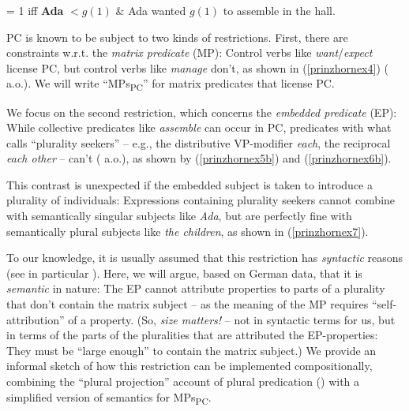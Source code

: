 \documentclass[output=paper,colorlinks,citecolor=brown,
]{langscibook}
\begin{document}
\ea	\label{prinzhornex3}  = 1 iff \textbf{Ada} $< g(1)$ $\&$ Ada wanted $g(1)$ to assemble in the hall. \z

PC is known to be subject to two kinds of restrictions. First, there are constraints w.r.t. the {\it matrix predicate} (MP): Control verbs like {\it want}/{\it expect} license PC, but control verbs like {\it  manage} don't, as shown in (\ref{prinzhornex4}) (\citealt{Landau:2000, Pearson:2016} a.o.). We will write “MPs\textsubscript{PC}” for matrix predicates that license PC.

\z
	
We focus on the second restriction, which concerns the {\it embedded predicate} (EP): While collective predicates like  {\it assemble} can occur in PC, predicates with what \citet{Schwarzschild:1996} calls “plurality seekers” -- e.g., the distributive VP-mod\-i\-fi\-er {\it each}, the reciprocal  {\it each other} -- can't (\citealt{Landau:2000} a.o.), as shown by (\ref{prinzhornex5b}) and (\ref{prinzhornex6b}).

\ea\label{prinzhornex5}
\z\z

This contrast is unexpected if the embedded subject is taken to introduce a plurality of individuals: Expressions containing plurality seekers cannot combine with semantically singular subjects like {\it Ada}, but are perfectly fine with semantically plural subjects like {\it the children}, as shown in (\ref{prinzhornex7}).

\ea \label{prinzhornex7}
\z\z

To our knowledge, it is usually assumed that this restriction has {\it syntactic} reasons (see in particular \citealt{Landau:2000}). Here, we will argue, based on German data, that it is {\it semantic} in nature: The EP cannot attribute properties to parts of a plurality that don't contain the matrix subject --  as the meaning of the MP requires “self-attribution” of a property. (So, \textit{size matters!} -- not in syntactic terms for us, but in terms of the parts of the pluralities that are attributed the EP-properties: They must be “large enough” to contain the matrix subject.) We provide an informal sketch of how this restriction can be implemented compositionally, combining  the “plural projection” account of plural predication (\citealt{Schmitt:2019, Haslinger:2018a, Haslinger:2018b}) with a simplified version of \citet{Pearson:2016} semantics for MPs\textsubscript{PC}.
\end{document}
